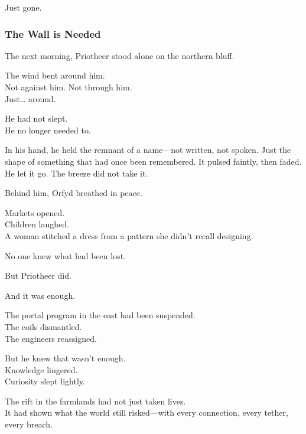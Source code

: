 \documentclass[12pt]{article}
\begin{document}
\vspace{0.5em}
Just gone.

\dotfill

\subsubsection*{The Wall is Needed}

The next morning, Priotheer stood alone on the northern bluff.

\vspace{0.5em}
The wind bent around him.\\
Not against him. Not through him.\\
Just\ldots{} around.

\vspace{0.5em}
He had not slept.\\
He no longer needed to.

\vspace{0.5em}
In his hand, he held the remnant of a name---not written, not spoken. Just the shape of something that had once been remembered. It pulsed faintly, then faded. He let it go. The breeze did not take it.

\vspace{0.5em}
Behind him, Orfyd breathed in peace.

\vspace{0.5em}
Markets opened.\\
Children laughed.\\
A woman stitched a dress from a pattern she didn’t recall designing.

\vspace{0.5em}
No one knew what had been lost.

\vspace{0.5em}
But Priotheer did.

\vspace{0.5em}
And it was enough.

\vspace{0.5em}
The portal program in the east had been suspended.\\
The coils dismantled.\\
The engineers reassigned.

\vspace{0.5em}
But he knew that wasn’t enough.\\
Knowledge lingered.\\
Curiosity slept lightly.

\vspace{0.5em}
The rift in the farmlands had not just taken lives.\\
It had shown what the world still risked---with every connection, every tether, every breach.
\end{document}
